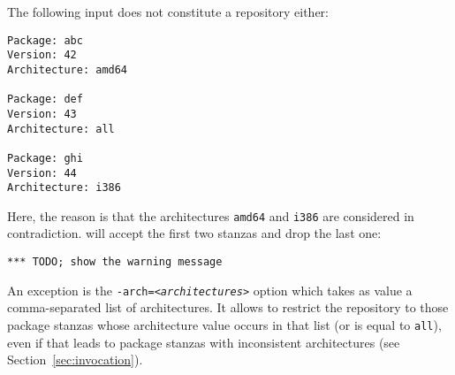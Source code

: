 \begin{enumerate}
\begin{example} The following input does not constitute a repository either:
\begin{verbatim}
Package: abc
Version: 42
Architecture: amd64

Package: def
Version: 43
Architecture: all

Package: ghi
Version: 44
Architecture: i386
\end{verbatim}
Here, the reason is that the architectures \texttt{amd64} and
\texttt{i386} are considered in contradiction. \debcheck{} will accept
the first two stanzas and drop the last one:
\begin{verbatim}
*** TODO; show the warning message
\end{verbatim}

\end{example}

  An exception is the \texttt{-arch=\textit{<architectures>}} option which
  takes as value a comma-separated list of architectures. It allows to
  restrict the repository to those package stanzas whose architecture
  value occurs in that list (or is equal to \texttt{all}), even if that 
  leads to package stanzas with inconsistent architectures
  (see Section~\ref{sec:invocation}).
\end{enumerate}



